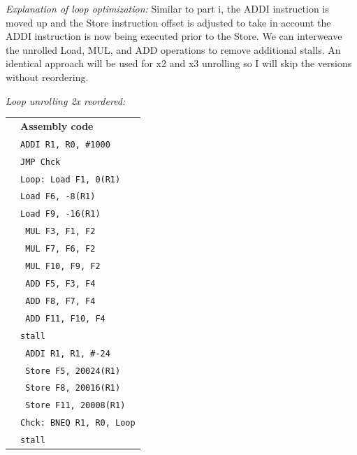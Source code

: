 \documentclass[a4paper, 11pt]{exam}
\begin{document}
\begin{enumerate}
\begin{enumerate}
\hfill

\textit{Explanation of loop optimization:} Similar to part i, the ADDI instruction is moved up and the Store instruction offset is adjusted to take in account the ADDI instruction is now being executed prior to the Store. We can interweave the unrolled Load, MUL, and ADD operations to remove additional stalls. An identical approach will be used for x2 and x3 unrolling so I will skip the versions without reordering.

\hfill

\textit{Loop unrolling 2x reordered:}

\hfill

\begin{tabular}{ll}
	& \textbf{Assembly code }\\
	&\hspace{40pt}\texttt{ADDI R1, R0, \#1000} \\
	&\hspace{40pt}\texttt{JMP Chck}\\
	&\texttt{Loop: Load F1, 0(R1)} \\
	&\hspace{40pt}\texttt{Load F6, -8(R1)} \\
	&\hspace{40pt}\texttt{Load F9, -16(R1)} \\
    &\hspace{35pt}\texttt{ MUL F3, F1, F2}\\
    &\hspace{35pt}\texttt{ MUL F7, F6, F2}\\
    &\hspace{35pt}\texttt{ MUL F10, F9, F2}\\
	&\hspace{35pt}\texttt{ ADD F5, F3, F4}\\
	&\hspace{35pt}\texttt{ ADD F8, F7, F4}\\
	&\hspace{35pt}\texttt{ ADD F11, F10, F4}\\
	&\hspace{40pt}\texttt{stall}\\
	&\hspace{35pt}\texttt{ ADDI R1, R1, \#-24}\\
	&\hspace{35pt}\texttt{ Store F5, 20024(R1)}\\
	&\hspace{35pt}\texttt{ Store F8, 20016(R1)}\\
	&\hspace{35pt}\texttt{ Store F11, 20008(R1)}\\
	&\texttt{Chck: BNEQ R1, R0, Loop}\\
	&\hspace{40pt}\texttt{stall}\\
\end{tabular}


\end{enumerate}
\end{enumerate}
\end{document}
